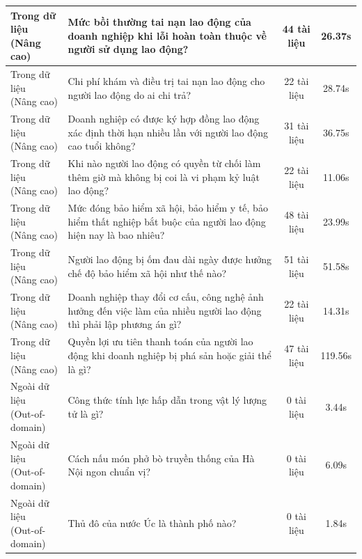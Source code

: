 \begin{longtable}{|l|p{6.5cm}|c|c|}
\makecell[l]{Trong dữ liệu\\(Nâng cao)} & Mức bồi thường tai nạn lao động của doanh nghiệp khi lỗi hoàn toàn thuộc về người sử dụng lao động? & 44 tài liệu & 26.37s \\ \hline
\makecell[l]{Trong dữ liệu\\(Nâng cao)} & Chi phí khám và điều trị tai nạn lao động cho người lao động do ai chi trả? & 22 tài liệu & 28.74s \\ \hline
\makecell[l]{Trong dữ liệu\\(Nâng cao)} & Doanh nghiệp có được ký hợp đồng lao động xác định thời hạn nhiều lần với người lao động cao tuổi không? & 31 tài liệu & 36.75s \\ \hline
\makecell[l]{Trong dữ liệu\\(Nâng cao)} & Khi nào người lao động có quyền từ chối làm thêm giờ mà không bị coi là vi phạm kỷ luật lao động? & 22 tài liệu & 11.06s \\ \hline
\makecell[l]{Trong dữ liệu\\(Nâng cao)} & Mức đóng bảo hiểm xã hội, bảo hiểm y tế, bảo hiểm thất nghiệp bắt buộc của người lao động hiện nay là bao nhiêu? & 48 tài liệu & 23.99s \\ \hline
\makecell[l]{Trong dữ liệu\\(Nâng cao)} & Người lao động bị ốm đau dài ngày được hưởng chế độ bảo hiểm xã hội như thế nào? & 51 tài liệu & 51.58s \\ \hline
\makecell[l]{Trong dữ liệu\\(Nâng cao)} & Doanh nghiệp thay đổi cơ cấu, công nghệ ảnh hưởng đến việc làm của nhiều người lao động thì phải lập phương án gì? & 22 tài liệu & 14.31s \\ \hline
\makecell[l]{Trong dữ liệu\\(Nâng cao)} & Quyền lợi ưu tiên thanh toán của người lao động khi doanh nghiệp bị phá sản hoặc giải thể là gì? & 47 tài liệu & 119.56s \\ \hline
\makecell[l]{Ngoài dữ liệu\\(Out-of-domain)} & Công thức tính lực hấp dẫn trong vật lý lượng tử là gì? & 0 tài liệu & 3.44s \\ \hline
\makecell[l]{Ngoài dữ liệu\\(Out-of-domain)} & Cách nấu món phở bò truyền thống của Hà Nội ngon chuẩn vị? & 0 tài liệu & 6.09s \\ \hline
\makecell[l]{Ngoài dữ liệu\\(Out-of-domain)} & Thủ đô của nước Úc là thành phố nào? & 0 tài liệu & 1.84s \\ \hline

\end{longtable}
